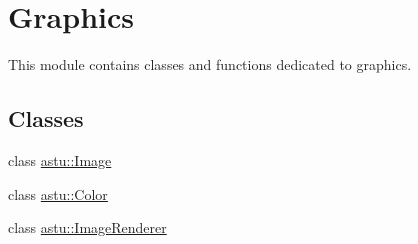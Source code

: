 \hypertarget{group__gfx__group}{}\section{Graphics}
\label{group__gfx__group}


This module contains classes and functions dedicated to graphics.  


\subsection*{Classes}
\begin{DoxyCompactItemize}
\item 
class \hyperlink{classastu_1_1Image}{astu\+::\+Image}
\item 
class \hyperlink{classastu_1_1Color}{astu\+::\+Color}
\item 
class \hyperlink{classastu_1_1ImageRenderer}{astu\+::\+Image\+Renderer}
\end{DoxyCompactItemize}
